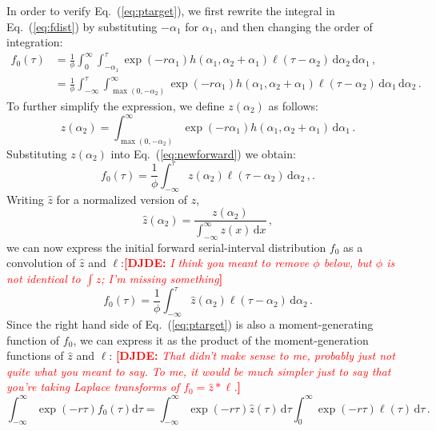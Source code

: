 \documentclass[12pt]{article}
\newcommand{\comment}{\showcomment}
\newcommand{\showcomment}[3]{\textcolor{#1}{\textbf{[#2: }\textsl{#3}\textbf{]}}}
\newcommand{\djde}[1]{\comment{red}{DJDE}{#1}}
\newcommand{\eref}[1]{Eq.~(\ref{eq:#1})}
\newcommand{\dd}[1]{\ensuremath{\, \mathrm{d}#1}}
\newcommand{\dtau}{\dd{\tau}}
\newcommand{\dx}{\dd{x}}
\newcommand{\pinf}{\ensuremath{\alpha_1}} %
\newcommand{\sinf}{\ensuremath{\alpha_2}} %
\newcommand{\idist}{\ell} %
\begin{document}
In order to verify \eref{ptarget}, we first rewrite the integral in \eref{fdist} by substituting $-\alpha_1$ for $\alpha_1$, and then changing the order of integration:
\begin{align}
f_{0}(\tau) &= \frac{1}{\phi} \int_0^\infty \int_{-\pinf}^{\tau} \exp(-r\pinf) h(\pinf, \sinf + \pinf) \idist(\tau - \sinf)\, \mathrm{d}\sinf\,\mathrm{d}\pinf\,,\nonumber \\
&= \frac{1}{\phi} \int_{-\infty}^{\tau} \int_{\max{(0,-\sinf)}}^{\infty} \exp(-r\pinf) h(\pinf, \sinf + \pinf)\idist(\tau - \sinf)\,\mathrm{d}\pinf\, \mathrm{d}\sinf\,.
\label{eq:newforward}
\end{align}
To further simplify the expression, we define $z(\sinf)$ as follows:
\begin{equation}
z(\sinf) = \int_{\max{(0,-\sinf)}}^{\infty} \exp(-r\pinf) h(\pinf, \sinf + \pinf) \,\mathrm{d}\pinf\,.
\end{equation}
Substituting $z(\sinf)$ into \eref{newforward} we obtain:
\begin{equation}
f_{0}(\tau) = \frac{1}{\phi} \int_{-\infty}^{\tau} z(\sinf) \idist(\tau - \sinf) \,\mathrm{d}\sinf\,,.
\end{equation}
Writing $\hat{z}$ for a normalized version of $z$,
\begin{equation}\hat{z}(\sinf) = \frac{z(\sinf)}{\int_{-\infty}^\infty z(x) \dx}\,,\end{equation}
we can now express the initial forward serial-interval distribution
$f_0$ as a convolution of $\hat{z}$ and $\idist$:\djde{I think you
  meant to remove $\phi$ below, but $\phi$ is not identical to $\int
  z$; I'm missing something}
\begin{equation}
f_{0}(\tau) = \frac{1}{\phi} \int_{-\infty}^{\tau} \hat{z}(\sinf) \idist(\tau - \sinf)\, \mathrm{d}\sinf\,.
\end{equation}
Since the right hand side of \eref{ptarget} is also a
moment-generating function of $f_0$, we can express it as the product
of the moment-generation functions of $\hat{z}$ and $\idist$:
\djde{That didn't make sense to me, probably just not quite what you
  meant to say.  To me, it would be much simpler just to say that
  you're taking Laplace transforms of $f_0=\hat{z}*\idist$.}
\begin{equation}
\int_{-\infty}^\infty \exp(-r\tau) f_{0}(\tau) \mathrm{d} \tau = \int_{-\infty}^\infty \exp(-r\tau) \hat{z}(\tau)\, \mathrm{d} \tau \int_{0}^\infty \exp(-r\tau) \idist(\tau) \dtau\,.
\label{eq:newtarget}
\end{equation}
\end{document}
